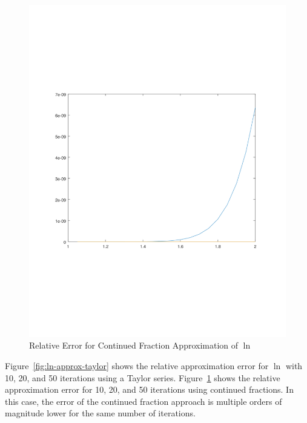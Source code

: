 \documentclass[11pt,a4paper,dvipsnames]{article}
\theoremstyle{definition}
\theoremstyle{definition}
\begin{document}
\begin{figure}[ht]
  \centering
    \includegraphics[width=\textwidth]{ln_cf}
  \caption{Relative Error for Continued Fraction Approximation of  $\ln$}
  \label{fig:ln-approx-cf}
\end{figure}

Figure~\ref{fig:ln-approx-taylor} shows the relative approximation error for
$\ln$ with 10, 20, and 50 iterations using a Taylor
series. Figure~\ref{fig:ln-approx-cf} shows the relative approximation error for
10, 20, and 50 iterations using continued fractions. In this case, the error of
the continued fraction approach is multiple orders of magnitude lower for the
same number of iterations.
\end{document}
